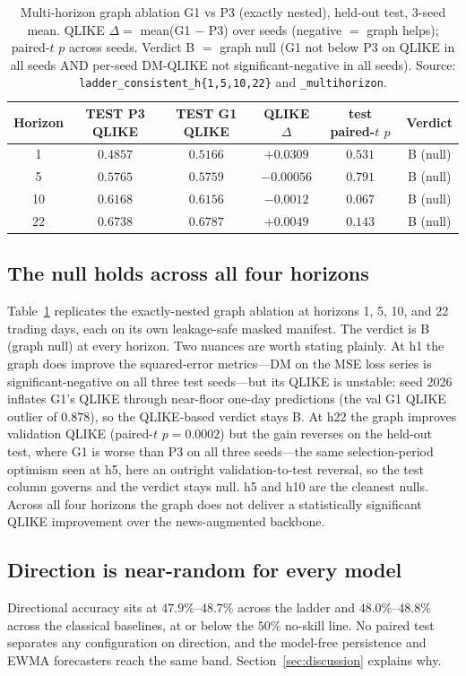 \documentclass[runningheads]{llncs}
\newcommand{\nseed}{3}
\begin{document}
\begin{table}[t]
\caption{Multi-horizon graph ablation G1 vs P3 (exactly nested), held-out test, \nseed-seed mean. QLIKE
$\Delta=$ mean(G1 $-$ P3) over seeds (negative $=$ graph helps); paired-$t$ $p$ across seeds. Verdict B $=$
graph null (G1 not below P3 on QLIKE in all seeds AND per-seed DM-QLIKE not significant-negative in all
seeds). Source: \texttt{ladder\_consistent\_h\{1,5,10,22\}} and \texttt{\_multihorizon}.}
\label{tab:graph}
\centering
\begin{tabular}{cccccc}
\toprule
Horizon & TEST P3 QLIKE & TEST G1 QLIKE & QLIKE $\Delta$ & test paired-$t$ $p$ & Verdict \\
\midrule
1  & $0.4857$ & $0.5166$ & $+0.0309$  & $0.531$ & B (null) \\
5  & $0.5765$ & $0.5759$ & $-0.00056$ & $0.791$ & B (null) \\
10 & $0.6168$ & $0.6156$ & $-0.0012$  & $0.067$ & B (null) \\
22 & $0.6738$ & $0.6787$ & $+0.0049$  & $0.143$ & B (null) \\
\bottomrule
\end{tabular}
\end{table}

\subsection{The null holds across all four horizons}
\label{sec:multihorizon}
Table~\ref{tab:graph} replicates the exactly-nested graph ablation at horizons 1, 5, 10, and 22 trading
days, each on its own leakage-safe masked manifest. The verdict is B (graph null) at every horizon. Two
nuances are worth stating plainly. At h1 the graph does improve the squared-error metrics---DM on the MSE
loss series is significant-negative on all three test seeds---but its QLIKE is unstable: seed 2026 inflates
G1's QLIKE through near-floor one-day predictions (the val G1 QLIKE outlier of $0.878$), so the
QLIKE-based verdict stays B. At h22 the graph improves validation QLIKE (paired-$t$ $p=0.0002$) but the
gain reverses on the held-out test, where G1 is worse than P3 on all three seeds---the same
selection-period optimism seen at h5, here an outright validation-to-test reversal, so the test column
governs and the verdict stays null. h5 and h10 are the cleanest nulls. Across all four horizons the graph
does not deliver a statistically significant QLIKE improvement over the news-augmented backbone.

\subsection{Direction is near-random for every model}
\label{sec:direction}
Directional accuracy sits at $47.9\%$--$48.7\%$ across the ladder and $48.0\%$--$48.8\%$ across the
classical baselines, at or below the $50\%$ no-skill line. No paired test separates any configuration on
direction, and the model-free persistence and EWMA forecasters reach the same band.
Section~\ref{sec:discussion} explains why.
\end{document}
